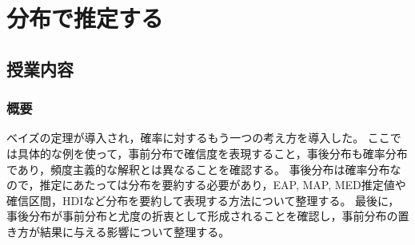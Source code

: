 \section{分布で推定する}
\label{b26_bayesian_approach}

\subsection{授業内容}
\subsubsection{概要}
ベイズの定理が導入され，確率に対するもう一つの考え方を導入した。
ここでは具体的な例を使って，事前分布で確信度を表現すること，事後分布も確率分布であり，頻度主義的な解釈とは異なることを確認する。
事後分布は確率分布なので，推定にあたっては分布を要約する必要があり，EAP, MAP, MED推定値や確信区間，HDIなど分布を要約して表現する方法について整理する。
最後に，事後分布が事前分布と尤度の折衷として形成されることを確認し，事前分布の置き方が結果に与える影響について整理する。
